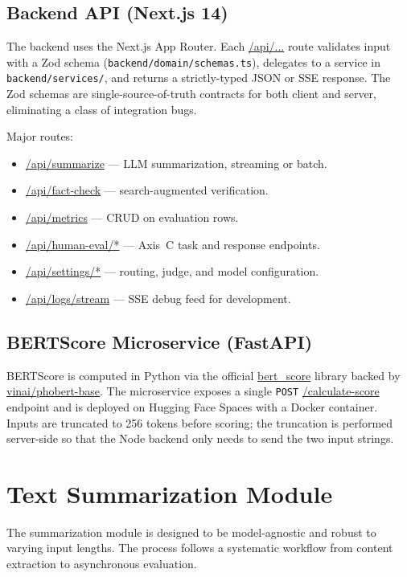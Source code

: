 \subsection{Backend API (Next.js 14)}

The backend uses the Next.js App Router. Each \url{/api/...} route
validates input with a Zod schema (\texttt{backend/domain/}\allowbreak\texttt{schemas.ts}),
delegates to a service in \texttt{backend/}\allowbreak\texttt{services/}, and returns a
strictly-typed JSON or SSE response. The Zod schemas are
single-source-of-truth contracts for both client and server, eliminating
a class of integration bugs.

Major routes:

\begin{itemize}
  \item \url{/api/summarize} --- LLM summarization, streaming or batch.
  \item \url{/api/fact-check} --- search-augmented verification.
  \item \url{/api/metrics} --- CRUD on evaluation rows.
  \item \url{/api/human-eval/*} --- Axis~C task and response endpoints.
  \item \url{/api/settings/*} --- routing, judge, and model configuration.
  \item \url{/api/logs/stream} --- SSE debug feed for development.
\end{itemize}


\subsection{BERTScore Microservice (FastAPI)}

BERTScore is computed in Python via the official \url{bert_score}
library backed by \url{vinai/phobert-base}. The microservice exposes a
single \texttt{POST} \url{/calculate-score} endpoint and is deployed on
Hugging Face Spaces with a Docker container. Inputs are truncated to
256 tokens before scoring; the truncation is performed server-side so
that the Node backend only needs to send the two input strings.

\section{Text Summarization Module}

The summarization module is designed to be model-agnostic and robust to varying
input lengths. The process follows a systematic workflow from content
extraction to asynchronous evaluation.

